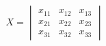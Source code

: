     \begin{center}
        \begin{equation*}
            X =
            \begin{vmatrix}
                x_{11} & x_{12} & x_{13} \\
                x_{21} & x_{22} & x_{23} \\
                x_{31} & x_{32} & x_{33}
            \end{vmatrix}
        \end{equation*}
    \end{center}
